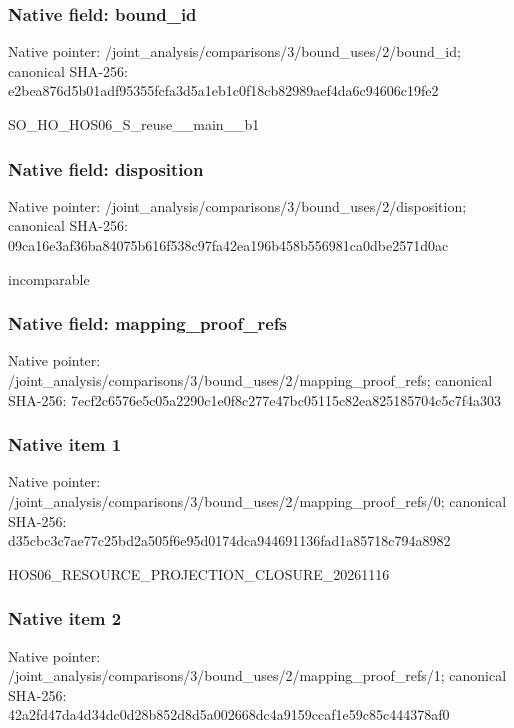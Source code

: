 \documentclass[10pt,a4paper]{article}
\begin{document}
\subsubsection{Native field: bound\_\allowbreak{}id}
Native pointer: /joint\_\allowbreak{}analysis/comparisons/3/bound\_\allowbreak{}uses/2/bound\_\allowbreak{}id; canonical SHA-256: e2bea876d5b01adf95355fcfa3d5a1eb1c0f18cb82989aef4da6c94606c19fe2

\begingroup\raggedright\sloppy SO\_\allowbreak{}HO\_\allowbreak{}HOS06\_\allowbreak{}S\_\allowbreak{}reuse\_\allowbreak{}\_\allowbreak{}main\_\allowbreak{}\_\allowbreak{}b1\par\endgroup

\subsubsection{Native field: disposition}
Native pointer: /joint\_\allowbreak{}analysis/comparisons/3/bound\_\allowbreak{}uses/2/disposition; canonical SHA-256: 09ca16e3af36ba84075b616f538c97fa42ea196b458b556981ca0dbe2571d0ac

\begingroup\raggedright\sloppy incomparable\par\endgroup

\subsubsection{Native field: mapping\_\allowbreak{}proof\_\allowbreak{}refs}
Native pointer: /joint\_\allowbreak{}analysis/comparisons/3/bound\_\allowbreak{}uses/2/mapping\_\allowbreak{}proof\_\allowbreak{}refs; canonical SHA-256: 7ecf2c6576e5c05a2290c1e0f8c277e47bc05115c82ea825185704c5c7f4a303

\subsubsection{Native item 1}
Native pointer: /joint\_\allowbreak{}analysis/comparisons/3/bound\_\allowbreak{}uses/2/mapping\_\allowbreak{}proof\_\allowbreak{}refs/0; canonical SHA-256: d35cbc3c7ae77c25bd2a505f6e95d0174dca944691136fad1a85718c794a8982

\begingroup\raggedright\sloppy HOS06\_\allowbreak{}RESOURCE\_\allowbreak{}PROJECTION\_\allowbreak{}CLOSURE\_\allowbreak{}20261116\par\endgroup

\subsubsection{Native item 2}
Native pointer: /joint\_\allowbreak{}analysis/comparisons/3/bound\_\allowbreak{}uses/2/mapping\_\allowbreak{}proof\_\allowbreak{}refs/1; canonical SHA-256: 42a2fd47da4d34dc0d28b852d8d5a002668dc4a9159ccaf1e59c85c444378af0
\end{document}
